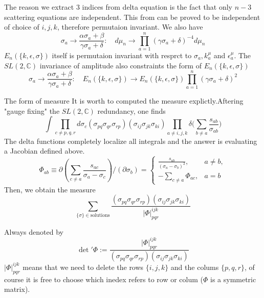 \documentclass{beamer}
\begin{document}
\begin{frame}
    The reason we extract 3 indices from delta equation is the fact that only $n-3$ scattering equations are independent.
    This from can be proved to be \alert{independent of choice of $i,j,k$}, therefore permutaion invariant.
    We also have
    \begin{equation*}
        \sigma_a\to\frac{\alpha\sigma_a+\beta}{\gamma\sigma_a+\delta}:\quad d\mu_n\to\prod_{a=1}^n(\gamma\sigma_a+\delta)^{-4}d\mu_n
    \end{equation*}
    $E_n(\{k,\epsilon,\sigma\})$ itself is permutaion invariant with resprct to $\sigma_a,k_a^\mu$ and $\epsilon_a^\mu$. The $SL(2,\mathbb{C})$ invariance of amplitude also 
    constraints the form of $E_n(\{k,\epsilon,\sigma\})$
    \begin{equation*}
        \sigma_a\to\frac{\alpha\sigma_a+\beta}{\gamma\sigma_a+\delta}:\quad E_n(\{k,\epsilon,\sigma\})\to E_n(\{k,\epsilon,\sigma\})\prod_{a=1}^n(\gamma\sigma_a+\delta)^2
    \end{equation*}
\end{frame}
\begin{frame}{The form of measure}
    It is worth to computed the measure explictly.Aftering "gauge fixing" the $SL(2,\mathbb{C})$ redundancy, one finds 
    \begin{equation*}
        \int\prod_{c\neq p,q,r}d\sigma_c(\sigma_{pq}\sigma_{qr}\sigma_{rp})(\sigma_{ij}\sigma_{jk}\sigma_{ki})\prod_{a\neq i,j,k}\delta\biggl(\sum_{b\neq a}\frac{s_{ab}}{\sigma_{ab}}\biggr)
    \end{equation*}
    The delta functions completely localize all integrals and the answer is evaluating a Jacobian defined above.
    \begin{equation*}
            \Phi_{ab}\equiv\partial\left(\sum_{c\neq a}\frac{s_{ac}}{\sigma_a-\sigma_c}\right)/\left(\partial\sigma_b\right)=\begin{cases}\frac{s_{ab}}{(\sigma_a-\sigma_b)^2},&a\neq b,\\-\sum_{c\neq a}\Phi_{ac}, &a=b\end{cases}
    \end{equation*}
    Then, we obtain the measure
    \begin{equation*}
            \boxed{
            \sum_{\{\sigma\}\in\mathrm{solutions}}\frac{(\sigma_{pq}\sigma_{qr}\sigma_{rp})(\sigma_{ij}\sigma_{jk}\sigma_{ki})}{|\Phi|_{pqr}^{ijk}}}
    \end{equation*}
\end{frame}
\begin{frame}
    Always denoted by 
    \begin{equation*}
        \boxed{
        \det{'}\Phi:=\frac{|\Phi|_{pqr}^{ijk}}{(\sigma_{pq}\sigma_{qr}\sigma_{rp})(\sigma_{ij}\sigma_{jk}\sigma_{ki})}}
    \end{equation*}
    $|\Phi|_{pqr}^{ijk}$ means that we need to delete the rows $\{i,j,k\}$ and the colums $\{p,q,r\}$, of course it is free to choose which inedex refers
    to row or colum ($\Phi$ is a symmetric matrix).
\end{frame}
\end{document}
